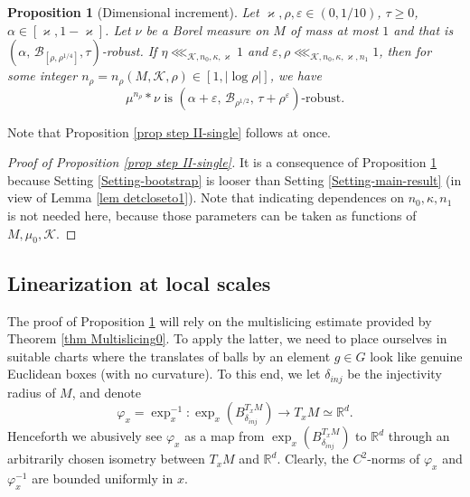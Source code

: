 \documentclass[11pt, leqno, fleqn]{amsart}
\def\eps{\varepsilon}
\newcommand{\margem}[1]{\marginpar{{\scriptsize {#1}}}}
\def\cB{          \mathcal B}
\def\clr{   \color{red}}
\def\clo{   \color{orange}}
\def \R{{\mathbb R}}
\newcommand{\cK}{{\mathcal K}}
\newtheorem{prop}[thm]{\bf Proposition}
\theoremstyle{definition}
\theoremstyle{definition}
\begin{document}
		 
		   \begin{prop}[Dimensional increment] \label{prop step II-single-gen} 
		 	Let $\varkappa,\rho,  \eps \in (0,1/10)$,   $\tau \geq 0$, $\alpha \in [\varkappa, 1 - \varkappa]$. Let $\nu$ be a Borel measure on $M$ of mass at most $1$ and that is $(\alpha, \,\cB_{[\rho, \rho^{1/4}]}, \tau)$-robust.  If    $\eta\lll_{\cK,n_{0}, \kappa, \varkappa}1$ and $\eps, \rho\lll_{\cK,n_{0}, \kappa, \varkappa, n_{1}}1$, then for some integer $n_{\rho}=n_{\rho}(M, \cK, \rho) \in [1,  | \log \rho |]$, we have
			$$
			\text{$\mu^{n_{\rho}} * \nu$ is $(\alpha + \eps, \,\cB_{\rho^{1/2}},\, \tau + \rho^{\eps})$-robust.}
			$$
		 \end{prop}
		 
		 
	Note that Proposition \ref{prop step II-single} follows at once. 
	
	\begin{proof}[Proof of Proposition  \ref{prop step II-single}] 
	It is a consequence of Proposition  \ref{prop step II-single-gen} because Setting \ref{Setting-bootstrap} is looser than Setting \ref{Setting-main-result} (in view of Lemma \ref{lem detcloseto1}). Note that indicating dependences on $n_{0},\kappa, n_{1}$ is not needed here, because those parameters can be taken as functions of $M, \mu_{0}, \cK$. 
	\end{proof} 
	
	

	\subsection{Linearization at local scales}	  \label{subsec	linearcharts}
	
	The proof of Proposition \ref{prop step II-single-gen} will rely on the multislicing estimate provided by Theorem \ref{thm Multislicing0}. To apply the latter, we need to place ourselves in suitable charts where the translates of balls by an element $g\in G$ look like genuine Euclidean boxes (with no curvature).  
	To this end, we let $\delta_{inj}$ be the injectivity radius of $M$, and   denote $$\varphi_{x} = \exp_x^{-1} : \exp_x( B^{T_x M}_{\delta_{inj}} ) \to  T_xM \simeq \R^d.$$
	Henceforth we  abusively see  $\varphi_x$ as a map from $ \exp_x( B^{T_x M}_{\delta_{inj}} ) $ to $\R^d$ through  an arbitrarily chosen isometry between $T_x M$ and $\R^d$. Clearly, the $C^2$-norms of $\varphi_x$ and $\varphi_x^{-1}$ are  bounded uniformly in $x$.
	 
\end{document}

